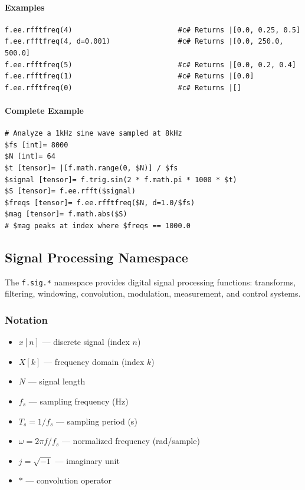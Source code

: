 \paragraph{Examples}
\begin{verbatim}
f.ee.rfftfreq(4)                         #c# Returns |[0.0, 0.25, 0.5]
f.ee.rfftfreq(4, d=0.001)                #c# Returns |[0.0, 250.0, 500.0]
f.ee.rfftfreq(5)                         #c# Returns |[0.0, 0.2, 0.4]
f.ee.rfftfreq(1)                         #c# Returns |[0.0]
f.ee.rfftfreq(0)                         #c# Returns |[]
\end{verbatim}

\paragraph{Complete Example}
\begin{verbatim}
# Analyze a 1kHz sine wave sampled at 8kHz
$fs [int]= 8000
$N [int]= 64
$t [tensor]= |[f.math.range(0, $N)] / $fs
$signal [tensor]= f.trig.sin(2 * f.math.pi * 1000 * $t)
$S [tensor]= f.ee.rfft($signal)
$freqs [tensor]= f.ee.rfftfreq($N, d=1.0/$fs)
$mag [tensor]= f.math.abs($S)
# $mag peaks at index where $freqs == 1000.0
\end{verbatim}

\subsection{Signal Processing Namespace}
\label{sec:sig-namespace}
The \texttt{f.sig.*} namespace provides digital signal processing functions: transforms, filtering, windowing, convolution, modulation, measurement, and control systems.

\subsubsection{Notation}
\begin{itemize}
\item $x[n]$ --- discrete signal (index $n$)
\item $X[k]$ --- frequency domain (index $k$)
\item $N$ --- signal length
\item $f_s$ --- sampling frequency (Hz)
\item $T_s = 1/f_s$ --- sampling period (s)
\item $\omega = 2\pi f / f_s$ --- normalized frequency (rad/sample)
\item $j = \sqrt{-1}$ --- imaginary unit
\item $*$ --- convolution operator
\end{itemize}

